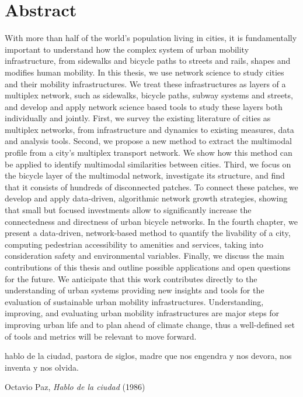 \documentclass[a4paper,twoside,12pt]{book}
\begin{document}
\chapter*{Abstract}
With more than half of the world's population living in cities, it is fundamentally important to understand how the complex system of urban mobility infrastructure, from sidewalks and bicycle paths to streets and rails, shapes and modifies human mobility. In this thesis, we use network science to study cities and their mobility infrastructures. We treat these infrastructures as layers of a multiplex network, such as sidewalks, bicycle paths, subway systems and streets, and develop and apply network science based tools to study these layers both individually and jointly. First, we survey the existing literature of cities as multiplex networks, from infrastructure and dynamics to existing measures, data and analysis tools. Second, we propose a new method to extract the multimodal profile from a city's multiplex transport network. We show how this method can be applied to identify multimodal similarities between cities. Third, we focus on the bicycle layer of the multimodal network, investigate its structure, and find that it consists of hundreds of disconnected patches. To connect these patches, we develop and apply data-driven, algorithmic network growth strategies, showing that small but focused investments allow to significantly increase the connectedness and directness of urban bicycle networks. In the fourth chapter, we present a data-driven, network-based method to quantify the livability of a city, computing pedestrian accessibility to amenities and services, taking into consideration safety and environmental variables. Finally, we discuss the main contributions of this thesis and outline possible applications and open questions for the future. We anticipate that this work contributes directly to the understanding of urban systems providing new insights and tools for the evaluation of sustainable urban mobility infrastructures. Understanding, improving, and evaluating urban mobility infrastructures are major steps for improving urban life and to plan ahead of climate change, thus a well-defined set of tools and metrics will be relevant to move forward.

\thispagestyle{empty}

\newpage
\frontmatter
\epigraph{hablo de la ciudad, pastora de siglos, madre que nos engendra y nos devora, nos inventa y nos olvida.}{Octavio Paz, \textit{Hablo de la ciudad} (1986)}
\vfill
\thispagestyle{empty}
\end{document}
